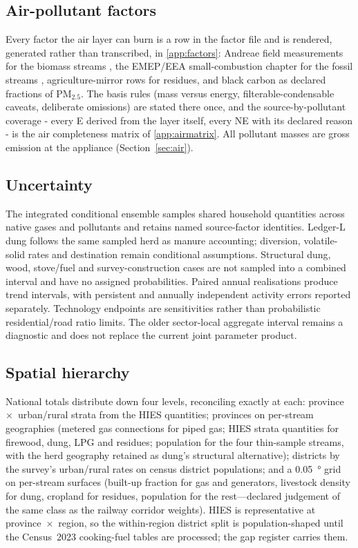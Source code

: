 \subsection{Air-pollutant factors}

Every factor the air layer can burn is a row in the factor file and is rendered,
generated rather than transcribed, in \ref{app:factors}: Andreae field measurements for
the biomass streams \citep{andreae2019}, the EMEP/EEA small-combustion chapter for the
fossil streams \citep{emep2023smallcombustion}, agriculture-mirror rows for residues,
and black carbon as declared fractions of PM$_{2.5}$. The basis rules (mass versus
energy, filterable-condensable caveats, deliberate omissions) are stated there once,
and the source-by-pollutant coverage - every E derived from the layer itself, every
NE with its declared reason - is the air completeness matrix of \ref{app:airmatrix}.
All pollutant masses are gross emission at the appliance (Section~\ref{sec:air}).

\subsection{Uncertainty}

The integrated conditional ensemble samples shared household quantities across native gases and pollutants and retains named source-factor identities. Ledger-L dung follows the same sampled herd as manure accounting; diversion, volatile-solid rates and destination remain conditional assumptions. Structural dung, wood, stove/fuel and survey-construction cases are not sampled into a combined interval and have no assigned probabilities. Paired annual realisations produce trend intervals, with persistent and annually independent activity errors reported separately. Technology endpoints are sensitivities rather than probabilistic residential/road ratio limits. The older sector-local aggregate interval remains a diagnostic and does not replace the current joint parameter product.

\subsection{Spatial hierarchy}

National totals distribute down four levels, reconciling exactly at each:
province~$\times$~urban/rural strata from the HIES quantities; provinces on per-stream
geographies (metered gas connections for piped gas; HIES strata quantities for
firewood, dung, LPG and residues; population for the four thin-sample streams, with
the herd geography retained as dung's structural alternative); districts by the
survey's urban/rural rates on census district populations; and a \SI{0.05}{\degree}
grid on per-stream surfaces (built-up fraction for gas and generators, livestock
density for dung, cropland for residues, population for the rest---declared judgement
of the same class as the railway corridor weights). HIES is representative at
province~$\times$~region, so the within-region district split is population-shaped
until the Census~2023 cooking-fuel tables are processed; the gap register carries them.

